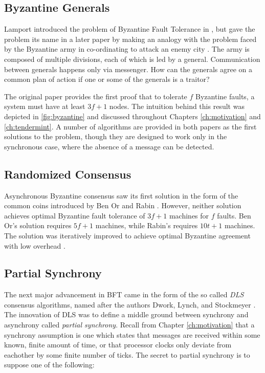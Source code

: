 \subsection{Byzantine Generals}

Lamport introduced the problem of Byzantine Fault Tolerance in \cite{pease1980reaching},
but gave the problem its name in a later paper by making an analogy with the problem faced
by the Byzantine army in co-ordinating to attack an enemy city \cite{lamport1982byzantine}.
The army is composed of multiple divisions, each of which is led by a general.
Communication between generals happens only via messenger.
How can the generals agree on a common plan of action if one or some of the generals is a traitor?

The original paper provides the first proof that to tolerate $f$ Byzantine faults,
a system must have at least $3f+1$ nodes. 
The intuition behind this result was depicted in \ref{fig:byzantine} and discussed 
throughout Chapters \ref{ch:motivation} and \ref{ch:tendermint}.
A number of algorithms are provided in both papers as the first solutions to the problem,
though they are designed to work only in the synchronous case, where the absence of a message can be detected.

\subsection{Randomized Consensus}

Asynchronous Byzantine consensus saw its first solution in the form of the common coins
introduced by Ben Or \cite{free-choice} and Rabin \cite{rabin1983randomized}.
However, neither solution achieves optimal Byzantine fault tolerance of $3f+1$ machines for $f$ faults.
Ben Or's solution requires $5f+1$ machines, while Rabin's requires $10t+1$ machines.
The solution was iteratively improved to achieve optimal Byzantine agreement with low overhead \cite{feldman1988optimal,canetti1993fast,cachin2000random}.

\subsection{Partial Synchrony}

The next major advancement in BFT came in the form of the so called \emph{DLS} consensus algorithms,
named after the authors Dwork, Lynch, and Stockmeyer \cite{DLS}.
The innovation of DLS was to define a middle ground between synchrony and asynchrony called \emph{partial synchrony}.
Recall from Chapter \ref{ch:motivation} that a synchrony assumption is one which states that messages 
are received within some known, finite amount of time, 
or that processor clocks only deviate from eachother by some finite number of ticks.
The secret to partial synchrony is to suppose one of the following:

